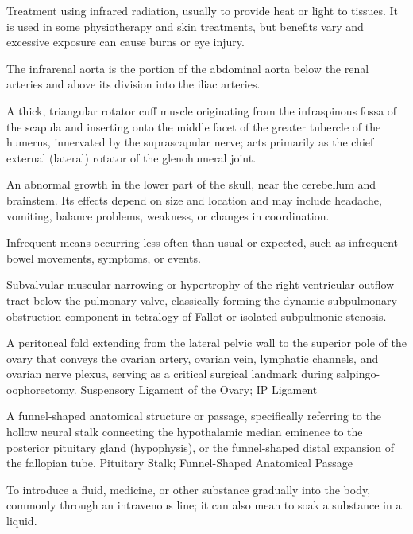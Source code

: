  Treatment using infrared radiation, usually to provide heat or light to tissues. It is used in some physiotherapy and skin treatments, but benefits vary and excessive exposure can cause burns or eye injury.

 The infrarenal aorta is the portion of the abdominal aorta below the renal arteries and above its division into the iliac arteries.

 A thick, triangular rotator cuff muscle originating from the infraspinous fossa of the scapula and inserting onto the middle facet of the greater tubercle of the humerus, innervated by the suprascapular nerve; acts primarily as the chief external (lateral) rotator of the glenohumeral joint.

 An abnormal growth in the lower part of the skull, near the cerebellum and brainstem. Its effects depend on size and location and may include headache, vomiting, balance problems, weakness, or changes in coordination.

 Infrequent means occurring less often than usual or expected, such as infrequent bowel movements, symptoms, or events.

 Subvalvular muscular narrowing or hypertrophy of the right ventricular outflow tract below the pulmonary valve, classically forming the dynamic subpulmonary obstruction component in tetralogy of Fallot or isolated subpulmonic stenosis.

 A peritoneal fold extending from the lateral pelvic wall to the superior pole of the ovary that conveys the ovarian artery, ovarian vein, lymphatic channels, and ovarian nerve plexus, serving as a critical surgical landmark during salpingo-oophorectomy.
\synonyms
Suspensory Ligament of the Ovary; IP Ligament

 A funnel-shaped anatomical structure or passage, specifically referring to the hollow neural stalk connecting the hypothalamic median eminence to the posterior pituitary gland (hypophysis), or the funnel-shaped distal expansion of the fallopian tube.
\synonyms
Pituitary Stalk; Funnel-Shaped Anatomical Passage

 To introduce a fluid, medicine, or other substance gradually into the body, commonly through an intravenous line; it can also mean to soak a substance in a liquid.

